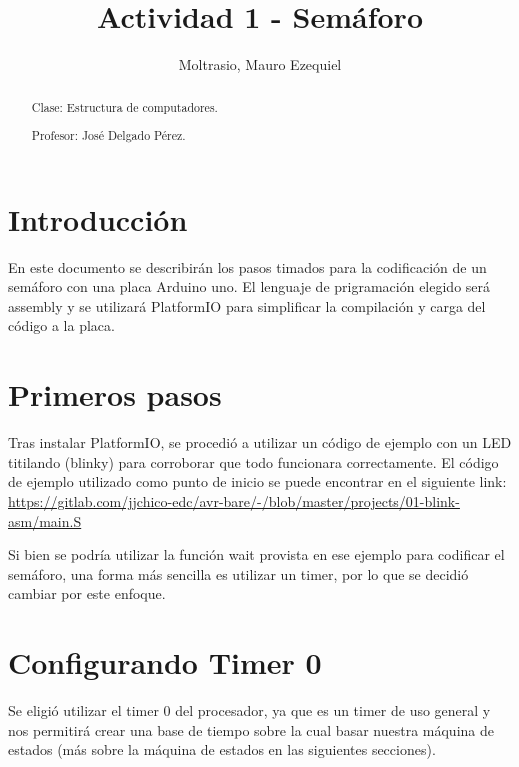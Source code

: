 \documentclass{article}
\begin{document}
\title{Actividad 1 - Semáforo}
\author{Moltrasio, Mauro Ezequiel}
\date{}
\renewcommand{\abstractname}{\vspace{-\baselineskip}}

\begin{titlingpage}
    \maketitle
    \begin{abstract}

        Clase: Estructura de computadores.

        Profesor: José Delgado Pérez.
    \end{abstract}
\end{titlingpage}

\tableofcontents

\section{Introducción}

En este documento se describirán los pasos timados para la codificación de un
semáforo con una placa Arduino uno. El lenguaje de prigramación elegido será
assembly y se utilizará PlatformIO para simplificar la compilación y carga del
código a la placa.

\section{Primeros pasos}

Tras instalar PlatformIO, se procedió a utilizar un código de ejemplo con un
LED titilando (blinky) para corroborar que todo funcionara correctamente.
El código de ejemplo utilizado como punto de inicio se puede encontrar en el
siguiente link: \url{https://gitlab.com/jjchico-edc/avr-bare/-/blob/master/projects/01-blink-asm/main.S}

Si bien se podría utilizar la función wait provista en ese ejemplo para
codificar el semáforo, una forma más sencilla es utilizar un timer, por lo que
se decidió cambiar por este enfoque.

\section{Configurando Timer 0}

Se eligió utilizar el timer 0 del procesador, ya que es un timer de uso
general y nos permitirá crear una base de tiempo sobre la cual basar nuestra
máquina de estados (más sobre la máquina de estados en las siguientes
secciones).
\end{document}
